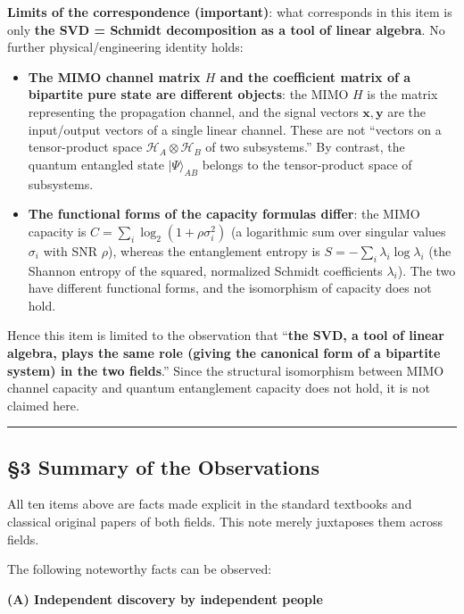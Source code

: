 \documentclass[
]{article}
\providecommand{\tightlist}{%
  \setlength{\itemsep}{0pt}\setlength{\parskip}{0pt}}
\begin{document}
\textbf{Limits of the correspondence (important)}: what corresponds in
this item is only \textbf{the SVD = Schmidt decomposition as a tool of
linear algebra}. No further physical/engineering identity holds:

\begin{itemize}
\tightlist
\item
  \textbf{The MIMO channel matrix \(H\) and the coefficient matrix of a
  bipartite pure state are different objects}: the MIMO \(H\) is the
  matrix representing the propagation channel, and the signal vectors
  \(\mathbf{x},\mathbf{y}\) are the input/output vectors of a single
  linear channel. These are not ``vectors on a tensor-product space
  \(\mathcal{H}_A\otimes\mathcal{H}_B\) of two subsystems.'' By
  contrast, the quantum entangled state \(|\Psi\rangle_{AB}\) belongs to
  the tensor-product space of subsystems.
\item
  \textbf{The functional forms of the capacity formulas differ}: the
  MIMO capacity is \(C=\sum_i\log_2(1+\rho\sigma_i^2)\) (a logarithmic
  sum over singular values \(\sigma_i\) with SNR \(\rho\)), whereas the
  entanglement entropy is \(S=-\sum_i\lambda_i\log\lambda_i\) (the
  Shannon entropy of the squared, normalized Schmidt coefficients
  \(\lambda_i\)). The two have different functional forms, and the
  isomorphism of capacity does not hold.
\end{itemize}

Hence this item is limited to the observation that ``\textbf{the SVD, a
tool of linear algebra, plays the same role (giving the canonical form
of a bipartite system) in the two fields}.'' Since the structural
isomorphism between MIMO channel capacity and quantum entanglement
capacity does not hold, it is not claimed here.

\begin{center}\rule{0.5\linewidth}{0.5pt}\end{center}

\subsection{§3 Summary of the
Observations}\label{summary-of-the-observations}

All ten items above are facts made explicit in the standard textbooks
and classical original papers of both fields. This note merely
juxtaposes them across fields.

The following noteworthy facts can be observed:

\textbf{(A) Independent discovery by independent people}
\end{document}
